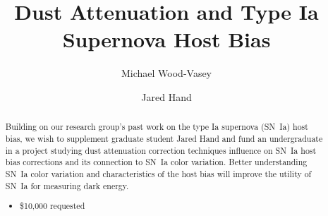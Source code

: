 \documentclass[modern]{aastex63}
\begin{document}
\title{Dust Attenuation and Type Ia Supernova Host Bias}


\author{Michael Wood-Vasey}

\author{Jared Hand}

\begin{abstract}
    Building on our research group's past work on the type Ia supernova (SN~Ia) host bias, we wish to supplement graduate student Jared Hand and fund an undergraduate in a project studying dust attenuation correction techniques influence on SN~Ia host bias corrections and its connection to SN~Ia color variation. Better understanding SN~Ia color variation and characteristics of the host bias will improve the utility of SN~Ia for measuring dark energy.
    \begin{itemize}
        \item \$10,000 requested
    \end{itemize}
\end{abstract}
\end{document}

